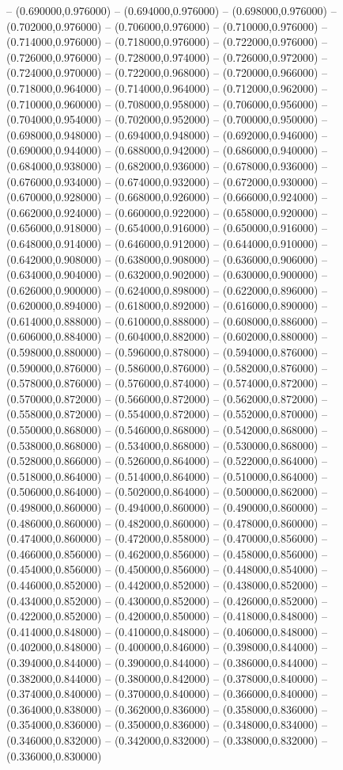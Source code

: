 -- (0.690000,0.976000) -- (0.694000,0.976000) -- (0.698000,0.976000) -- (0.702000,0.976000) -- (0.706000,0.976000) -- (0.710000,0.976000) -- (0.714000,0.976000) -- (0.718000,0.976000) -- (0.722000,0.976000) -- (0.726000,0.976000) -- (0.728000,0.974000) -- (0.726000,0.972000) -- (0.724000,0.970000) -- (0.722000,0.968000) -- (0.720000,0.966000) -- (0.718000,0.964000) -- (0.714000,0.964000) -- (0.712000,0.962000) -- (0.710000,0.960000) -- (0.708000,0.958000) -- (0.706000,0.956000) -- (0.704000,0.954000) -- (0.702000,0.952000) -- (0.700000,0.950000) -- (0.698000,0.948000) -- (0.694000,0.948000) -- (0.692000,0.946000) -- (0.690000,0.944000) -- (0.688000,0.942000) -- (0.686000,0.940000) -- (0.684000,0.938000) -- (0.682000,0.936000) -- (0.678000,0.936000) -- (0.676000,0.934000) -- (0.674000,0.932000) -- (0.672000,0.930000) -- (0.670000,0.928000) -- (0.668000,0.926000) -- (0.666000,0.924000) -- (0.662000,0.924000) -- (0.660000,0.922000) -- (0.658000,0.920000) -- (0.656000,0.918000) -- (0.654000,0.916000) -- (0.650000,0.916000) -- (0.648000,0.914000) -- (0.646000,0.912000) -- (0.644000,0.910000) -- (0.642000,0.908000) -- (0.638000,0.908000) -- (0.636000,0.906000) -- (0.634000,0.904000) -- (0.632000,0.902000) -- (0.630000,0.900000) -- (0.626000,0.900000) -- (0.624000,0.898000) -- (0.622000,0.896000) -- (0.620000,0.894000) -- (0.618000,0.892000) -- (0.616000,0.890000) -- (0.614000,0.888000) -- (0.610000,0.888000) -- (0.608000,0.886000) -- (0.606000,0.884000) -- (0.604000,0.882000) -- (0.602000,0.880000) -- (0.598000,0.880000) -- (0.596000,0.878000) -- (0.594000,0.876000) -- (0.590000,0.876000) -- (0.586000,0.876000) -- (0.582000,0.876000) -- (0.578000,0.876000) -- (0.576000,0.874000) -- (0.574000,0.872000) -- (0.570000,0.872000) -- (0.566000,0.872000) -- (0.562000,0.872000) -- (0.558000,0.872000) -- (0.554000,0.872000) -- (0.552000,0.870000) -- (0.550000,0.868000) -- (0.546000,0.868000) -- (0.542000,0.868000) -- (0.538000,0.868000) -- (0.534000,0.868000) -- (0.530000,0.868000) -- (0.528000,0.866000) -- (0.526000,0.864000) -- (0.522000,0.864000) -- (0.518000,0.864000) -- (0.514000,0.864000) -- (0.510000,0.864000) -- (0.506000,0.864000) -- (0.502000,0.864000) -- (0.500000,0.862000) -- (0.498000,0.860000) -- (0.494000,0.860000) -- (0.490000,0.860000) -- (0.486000,0.860000) -- (0.482000,0.860000) -- (0.478000,0.860000) -- (0.474000,0.860000) -- (0.472000,0.858000) -- (0.470000,0.856000) -- (0.466000,0.856000) -- (0.462000,0.856000) -- (0.458000,0.856000) -- (0.454000,0.856000) -- (0.450000,0.856000) -- (0.448000,0.854000) -- (0.446000,0.852000) -- (0.442000,0.852000) -- (0.438000,0.852000) -- (0.434000,0.852000) -- (0.430000,0.852000) -- (0.426000,0.852000) -- (0.422000,0.852000) -- (0.420000,0.850000) -- (0.418000,0.848000) -- (0.414000,0.848000) -- (0.410000,0.848000) -- (0.406000,0.848000) -- (0.402000,0.848000) -- (0.400000,0.846000) -- (0.398000,0.844000) -- (0.394000,0.844000) -- (0.390000,0.844000) -- (0.386000,0.844000) -- (0.382000,0.844000) -- (0.380000,0.842000) -- (0.378000,0.840000) -- (0.374000,0.840000) -- (0.370000,0.840000) -- (0.366000,0.840000) -- (0.364000,0.838000) -- (0.362000,0.836000) -- (0.358000,0.836000) -- (0.354000,0.836000) -- (0.350000,0.836000) -- (0.348000,0.834000) -- (0.346000,0.832000) -- (0.342000,0.832000) -- (0.338000,0.832000) -- (0.336000,0.830000) 